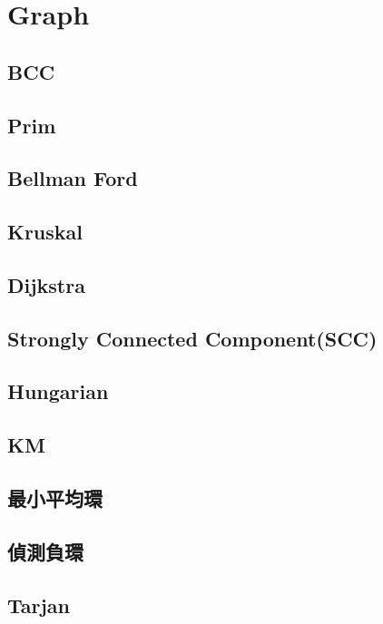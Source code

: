 \section{Graph}

\subsection{BCC}

\subsection{Prim}

\subsection{Bellman Ford}

\subsection{Kruskal}

\subsection{Dijkstra}

\subsection{Strongly Connected Component(SCC)}

\subsection{Hungarian}

\subsection{KM}

\subsection{最小平均環}

\subsection{偵測負環}

\subsection{Tarjan}

